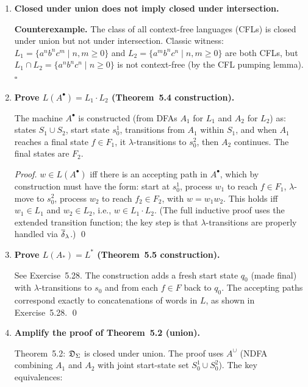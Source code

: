 \begin{enumerate}[{5.}1. ]
\textbf{A non-trivial example:} the collection of all context-free languages is closed under union and concatenation but not under intersection.

\item \textbf{Closed under union does not imply closed under intersection.}

\textbf{Counterexample.}  The class of all context-free languages (CFLs) is closed under union but not under intersection.  Classic witness: $L_1=\{a^nb^nc^m\mid n,m\geq 0\}$ and $L_2=\{a^mb^nc^n\mid n,m\geq 0\}$ are both CFLs, but $L_1\cap L_2=\{a^nb^nc^n\mid n\geq 0\}$ is not context-free (by the CFL pumping lemma).  $\square$

\item \textbf{Prove $L(A^\bullet)=L_1\cdot L_2$ (Theorem~5.4 construction).}

The machine $A^\bullet$ is constructed (from DFAs $A_1$ for $L_1$ and $A_2$ for $L_2$) as:
states $S_1\cup S_2$, start state $s^1_0$, transitions from $A_1$ within $S_1$, and when $A_1$ reaches a final state $f\in F_1$, it $\lambda$-transitions to $s^2_0$, then $A_2$ continues.  The final states are $F_2$.

\begin{proof}
$w\in L(A^\bullet)$ iff there is an accepting path in $A^\bullet$, which by construction must have the form: start at $s^1_0$, process $w_1$ to reach $f\in F_1$, $\lambda$-move to $s^2_0$, process $w_2$ to reach $f_2\in F_2$, with $w=w_1w_2$.  This holds iff $w_1\in L_1$ and $w_2\in L_2$, i.e., $w\in L_1\cdot L_2$.  (The full inductive proof uses the extended transition function; the key step is that $\lambda$-transitions are properly handled via $\overline{\delta}_\lambda$.) \qed
\end{proof}

\item \textbf{Prove $L(A_*)=L^*$ (Theorem~5.5 construction).}

See Exercise~5.28.  The construction adds a fresh start state $q_0$ (made final) with $\lambda$-transitions to $s_0$ and from each $f\in F$ back to $q_0$.  The accepting paths correspond exactly to concatenations of words in $L$, as shown in Exercise~5.28. \qed

\item \textbf{Amplify the proof of Theorem~5.2 (union).}

Theorem~5.2: $\mathfrak{D}_\Sigma$ is closed under union.  The proof uses $A^\cup$ (NDFA combining $A_1$ and $A_2$ with joint start-state set $S^1_0\cup S^2_0$).  The key equivalences:


\end{enumerate}
